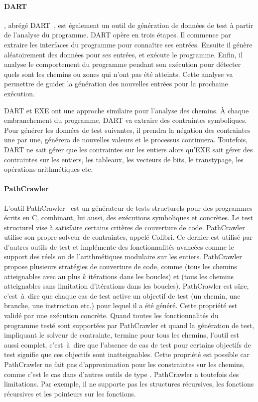 \paragraph{DART} , abrégé
DART~, est également un outil de génération de données de
test à partir de l'analyse du programme. DART opère en trois étapes. Il commence
par extraire les interfaces du programme pour connaître ses entrées. Ensuite il
génère aléatoirement des données pour ses entrées, et exécute le programme.
Enfin, il analyse le comportement du programme pendant son exécution pour
détecter quels sont les chemins ou zones qui n'ont pas été atteints. Cette
analyse va permettre de guider la génération des nouvelles entrées pour la
prochaine exécution.

DART et EXE ont une approche similaire pour l'analyse des chemins. À chaque
embranchement du programme, DART va extraire des contraintes symboliques. Pour
générer les données de test suivantes, il prendra la négation des contraintes
une par une, générera de nouvelles valeurs et le processus continuera.
Toutefois, DART ne sait gérer que les contraintes sur les entiers alors qu'EXE
sait gérer des contraintes sur les entiers, les tableaux, les vecteurs de bits,
le transtypage, les opérations arithmétiques etc.

\paragraph{PathCrawler} L'outil PathCrawler~ est un
générateur de tests structurels pour des programmes écrits en C, combinant, lui
aussi, des exécutions symboliques et concrètes. Le test structurel vise à
satisfaire certains critères de couverture de code. PathCrawler utilise son
propre solveur de contraintes, appelé Colibri. Ce dernier est utilisé par
d'autres outils de test et implémente des fonctionnalités avancées comme le
support des réels ou de l'arithmétiques modulaire sur les entiers. PathCrawler
propose plusieurs stratégies de couverture de code, comme
 (tous les chemins atteignables avec au plus $k$
itérations dans les boucles) et  (tous les chemins
atteignables sans limitation d'itérations dans les boucles). PathCrawler est
sûre, c'est~à~dire que chaque cas de test active un objectif de test (un chemin,
une branche, une instruction etc.) pour lequel il a été généré. Cette propriété
est validé par une exécution concrète. Quand toutes les fonctionnalités du
programme testé sont supportées par PathCrawler et quand la génération de test,
impliquant le solveur de contrainte, termine pour tous les chemins, l'outil est
aussi complet, c'est~à~dire que l'absence de cas de test pour certains objectifs
de test signifie que ces objectifs sont inatteignables. Cette propriété est
possible car PathCrawler ne fait pas d'approximation pour les constraintes sur
les chemins, comme c'est le cas dans d'autres outils de type
. PathCrawler a toutefois des limitations. Par exemple, il
ne supporte pas les structures récursives, les fonctions récursives et les
pointeurs sur les fonctions. \\

